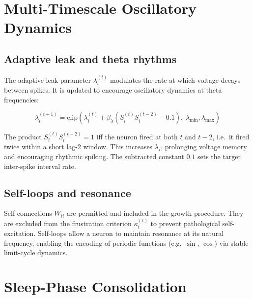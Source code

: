 \documentclass[12pt, a4paper]{article}
\begin{document}
\section{Multi-Timescale Oscillatory Dynamics}
\label{sec:oscillatory}

\subsection{Adaptive leak and theta rhythms}

The adaptive leak parameter $\lambda_i^{(t)}$ modulates the rate at which voltage
decays between spikes. It is updated to encourage oscillatory dynamics at theta
frequencies:

\begin{equation}
    \lambda_i^{(t+1)} = \text{clip}\!\left(
        \lambda_i^{(t)} + \beta_\lambda\left(S_i^{(t)} S_i^{(t-2)} - 0.1\right),\;
        \lambda_{\min}, \lambda_{\max}
    \right)
    \label{eq:lambda}
\end{equation}

The product $S_i^{(t)} S_i^{(t-2)} = 1$ iff the neuron fired at both $t$ and $t-2$,
i.e.\ it fired twice within a short lag-2 window. This increases $\lambda_i$,
prolonging voltage memory and encouraging rhythmic spiking. The subtracted constant
$0.1$ sets the target inter-spike interval rate.

\subsection{Self-loops and resonance}

Self-connections $W_{ii}$ are permitted and included in the growth procedure. They are
excluded from the frustration criterion $\kappa_i^{(t)}$ to prevent pathological
self-excitation. Self-loops allow a neuron to maintain resonance at its natural
frequency, enabling the encoding of periodic functions (e.g.\ $\sin$, $\cos$) via
stable limit-cycle dynamics.

\section{Sleep-Phase Consolidation}
\label{sec:sleep}
\end{document}
